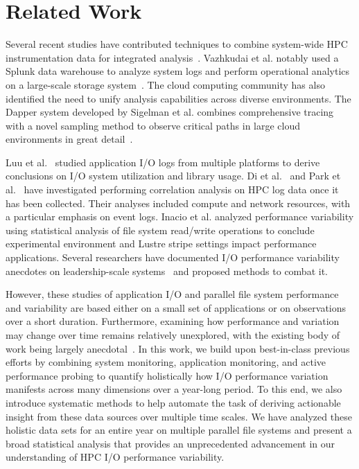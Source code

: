 \section{Related Work} \label{sec:related}

Several recent studies have contributed techniques to combine
system-wide HPC instrumentation data for integrated
analysis~\cite{Lockwood2017,Vazhkudai2017guide,Agelastos2014ldms,Kunkel2014siox,RIOT_2013}.
Vazhkudai et al. notably used a Splunk data warehouse to analyze system
logs and perform operational analytics on a large-scale storage system~\cite{Vazhkudai2017guide}.
The cloud computing community has also identified the need to unify
analysis capabilities across diverse environments.
The Dapper system
developed by Sigelman et al. combines comprehensive tracing with a novel
sampling method to observe critical paths in large cloud environments in great
detail~\cite{Sigelman2010dapper}.

Luu et al.~\cite{Luu:2015:HPDC} studied application I/O logs from multiple platforms to derive conclusions on I/O system utilization and library usage.
Di et al.~\cite{7973730} and Park et al.~\cite{Park2017BigDM} have
investigated performing correlation analysis on HPC log data once it has been
collected.  Their analyses included compute and network resources, with a
particular emphasis on event logs. Inacio et al. analyzed performance variability using statistical analysis of file system read/write operations to conclude experimental environment and Lustre stripe settings impact performance applications. 
Several researchers have documented 
I/O performance variability anecdotes on leadership-scale
systems~\cite{Lofstead2010,Yildiz2016,carns2011understanding} and proposed
methods to combat it.  

However, these studies of application I/O and parallel file system performance and variability are based either on a small set of applications or on observations over a short duration.
Furthermore, examining how performance and variation may change over time remains relatively unexplored, with the existing body of work being largely anecdotal~\cite{Haryadi2018fail}.
In this work, we build upon best-in-class previous efforts by combining system monitoring, application monitoring, and active performance probing
to quantify holistically how I/O performance variation manifests across many dimensions over a year-long period.
To this end, we also introduce systematic methods to help automate the task of deriving actionable insight from these data sources over multiple time scales.
We have analyzed these holistic data sets for an entire year on multiple parallel file systems and present a broad statistical analysis that provides an unprecedented advancement in our understanding of HPC I/O performance variability.